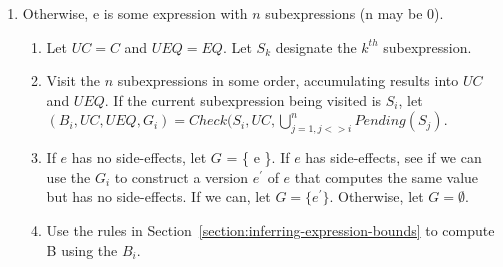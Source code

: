 \begin{enumerate}
\item Otherwise, e is some expression with $n$ subexpressions (n may be 0).
\label{list:check-general-operator}
\begin{enumerate}
\item Let $UC = C$ and $UEQ = EQ$.  Let $S_k$ designate the $k^{th}$ subexpression.
\item Visit the $n$ subexpressions in some order, accumulating results into $UC$ and $UEQ$.  If the current subexpression being visited is $S_i$,
let $(B_i, UC, UEQ, G_i) = Check(S_i, UC, \bigcup_{j= 1, j <> i}^{n} Pending(S_j)$.
\item If $e$ has no side-effects, let $G$ = \{ e \}.  If $e$ has side-effects, see if we can use the
$G_i$ to construct a version $e^\prime$ of $e$ that computes the same value but has no side-effects.  
If we can, let $G = \{ e^\prime \}$.  Otherwise, let $G = \emptyset$.
\item Use the rules in Section~\ref{section:inferring-expression-bounds} to compute B using the $B_i$.
\end{enumerate}
\end{enumerate}


